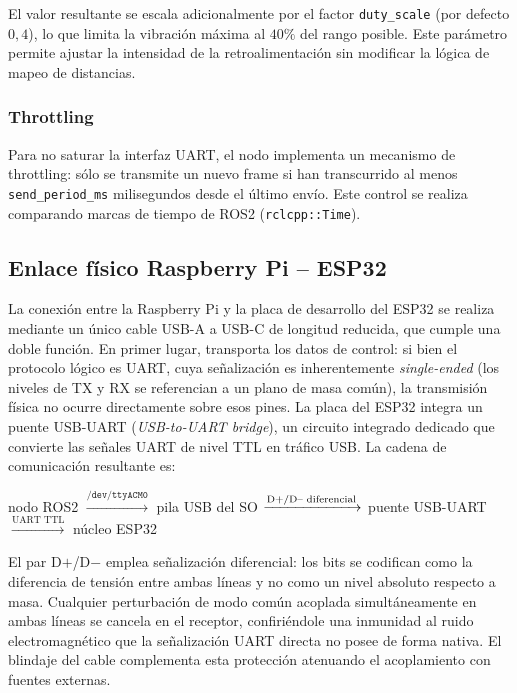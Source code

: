 El valor resultante se escala adicionalmente por el factor
\texttt{duty\_scale} (por defecto $0{,}4$), lo que limita la vibración máxima
al $40\%$ del rango posible. Este parámetro permite ajustar la intensidad de
la retroalimentación sin modificar la lógica de mapeo de distancias.

\subsubsection{Throttling}

Para no saturar la interfaz UART, el nodo implementa un mecanismo de
throttling: sólo se transmite un nuevo frame si han transcurrido al menos
\texttt{send\_period\_ms} milisegundos desde el último envío. Este control
se realiza comparando marcas de tiempo de ROS2 (\texttt{rclcpp::Time}).

\subsection{Enlace físico Raspberry Pi -- ESP32}
\label{sec:hw-enlace-fisico}

La conexión entre la Raspberry Pi y la placa de desarrollo del ESP32 se
realiza mediante un único cable USB-A a USB-C de longitud reducida, que
cumple una doble función. En primer lugar, transporta los datos de control:
si bien el protocolo lógico es UART, cuya señalización es inherentemente
\emph{single-ended} (los niveles de TX y RX se referencian a un plano de
masa común), la transmisión física no ocurre directamente sobre esos pines.
La placa del ESP32 integra un puente USB-UART (\emph{USB-to-UART bridge}),
un circuito integrado dedicado que convierte las señales UART de nivel TTL
en tráfico USB. La cadena de comunicación resultante es:

\begin{center}
  nodo ROS2 $\xrightarrow{\texttt{/dev/ttyACM0}}$ pila USB del SO
  $\xrightarrow{\text{D+/D\textendash\ diferencial}}$ puente USB-UART
  $\xrightarrow{\text{UART TTL}}$ núcleo ESP32
\end{center}

El par D$+$/D$-$ emplea señalización diferencial: los bits se codifican como
la diferencia de tensión entre ambas líneas y no como un nivel absoluto
respecto a masa. Cualquier perturbación de modo común acoplada
simultáneamente en ambas líneas se cancela en el receptor, confiriéndole
una inmunidad al ruido electromagnético que la señalización UART directa no
posee de forma nativa. El blindaje del cable complementa esta protección
atenuando el acoplamiento con fuentes externas.

